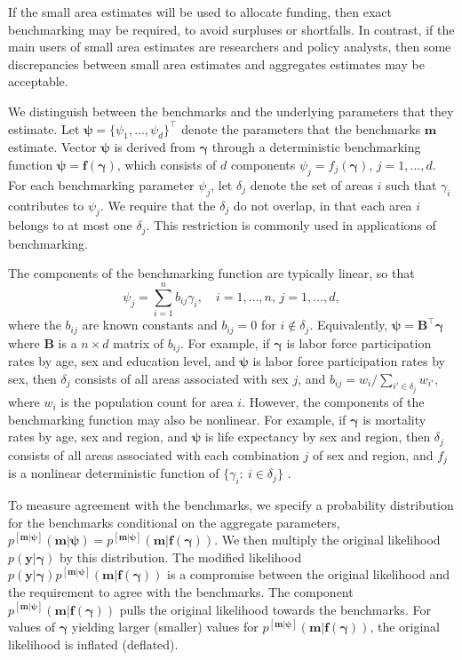 \documentclass[12pt]{article}
\begin{document}
If the small area estimates will be used to allocate funding, then exact benchmarking may be required, to avoid surpluses or shortfalls. In contrast, if the main users of small area estimates are researchers and policy analysts, then some discrepancies between small area estimates and aggregates estimates may be acceptable.

We distinguish between the benchmarks and the underlying parameters that they estimate. Let $\bm{\psi} = \{\psi_1, \dots, \psi_d\}^{\top}$ denote the parameters that the benchmarks $\bm{m}$ estimate. Vector $\bm{\psi}$ is derived from $\bm{\gamma}$ through a deterministic benchmarking function $\bm{\psi}=\bm{f}(\bm{\gamma})$, which consists of $d$ components $\psi_j=f_j(\bm{\gamma})$, $j=1,\dots,d$. For each benchmarking parameter $\psi_j$, let $\delta_j$ denote the set of areas $i$ such that $\gamma_i$ contributes to $\psi_j$.  We require that the $\delta_j$ do not overlap, in that each area $i$ belongs to at most one $\delta_j$. This restriction is commonly used in applications of benchmarking.

The components of the benchmarking function are typically linear, so that
\begin{equation}
   \psi_j = \sum_{i=1}^n b_{ij} \gamma_i, \quad i=1,\dots, n, \, j=1,\dots,d, \label{eq:benchmarking_constraint}
\end{equation}
where the $b_{ij}$ are known constants and $b_{ij}=0$ for $i\notin \delta_j$.  Equivalently, $\bm{\psi} = \bm{B}^{\top} \bm{\gamma}$ where $\bm{B}$ is a $n\times d$ matrix of $b_{ij}$. For example, if $\bm{\gamma}$ is labor force participation rates by age, sex and education level, and $\bm{\psi}$ is labor force participation rates by sex, then $\delta_j$ consists of all areas associated with sex $j$, and $b_{ij}=w_i/\sum_{i'\in \delta_j}w_{i'}$, where $w_i$ is the population count for area $i$.  However, the components of the benchmarking function may also be nonlinear.  For example, if $\bm{\gamma}$ is mortality rates by age, sex and region, and $\bm{\psi}$ is life expectancy by sex and region, then $\delta_j$ consists of all areas associated with each combination $j$ of sex and region, and $f_j$ is a nonlinear deterministic function of $\{\gamma_{i}:\ i\in\delta_j\}$ \citep[][ch. 3]{preston2001demography}.

To measure agreement with the benchmarks, we specify a probability distribution for the benchmarks conditional on the aggregate parameters, $p^{[\bm{m}|\bm{\psi}]}(\bm{m}|\bm{\psi})=p^{[\bm{m}|\bm{\psi}]}(\bm{m}|\bm{f}(\bm{\gamma}))$.  We then multiply the original likelihood $p(\bm{y}|\bm{\gamma})$ by this distribution. The modified likelihood $p(\bm{y}|\bm{\gamma})p^{[\bm{m}|\bm{\psi}]}(\bm{m}|\bm{f}(\bm{\gamma}))$ is a compromise between the original likelihood and the requirement to agree with the benchmarks.  The component $p^{[\bm{m}|\bm{\psi}]}(\bm{m}|\bm{f}(\bm{\gamma}))$ pulls the original likelihood towards the benchmarks.  For values of $\bm{\gamma}$ yielding larger (smaller) values for $p^{[\bm{m}|\bm{\psi}]}(\bm{m}|\bm{f}(\bm{\gamma}))$, the original likelihood is inflated (deflated).
\end{document}
